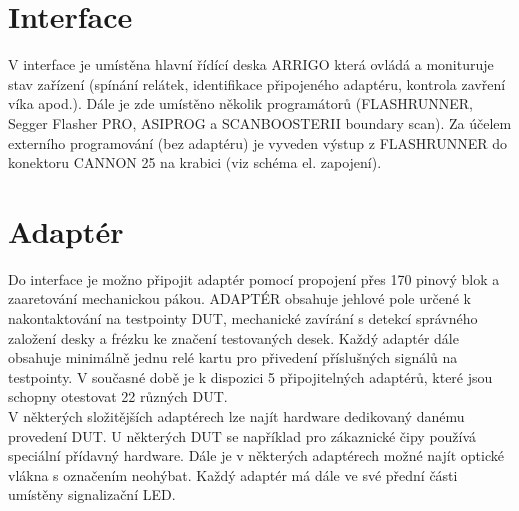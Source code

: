 	\section{Interface}
	V interface je umístěna hlavní řídící deska ARRIGO která ovládá a monituruje stav zařízení
	(spínání relátek, identifikace připojeného adaptéru, kontrola zavření víka apod.).
	Dále je zde umístěno několik programátorů (FLASHRUNNER, Segger Flasher PRO, ASIPROG a SCANBOOSTERII boundary scan).
	Za účelem externího programování (bez adaptéru) je vyveden výstup z FLASHRUNNER do konektoru CANNON 25
    na krabici (viz schéma el. zapojení).

	\section{Adaptér}
	Do interface je možno připojit adaptér pomocí propojení přes 170 pinový blok a zaaretování mechanickou pákou.
	ADAPTÉR obsahuje jehlové pole určené k nakontaktování na testpointy DUT,
	mechanické zavírání s detekcí správného založení desky a frézku ke značení testovaných desek.
	Každý adaptér dále obsahuje minimálně jednu relé kartu pro přivedení příslušných signálů na testpointy.
    V současné době je k dispozici 5 připojitelných adaptérů, které jsou schopny otestovat
    22 různých DUT.\\

    V některých složitějších adaptérech lze najít hardware dedikovaný danému provedení DUT. U některých DUT se například
    pro zákaznické čipy používá speciální přídavný hardware. Dále je v některých adaptérech možné najít optické vlákna
    s označením neohýbat. Každý adaptér má dále ve své přední části umístěny signalizační LED.

